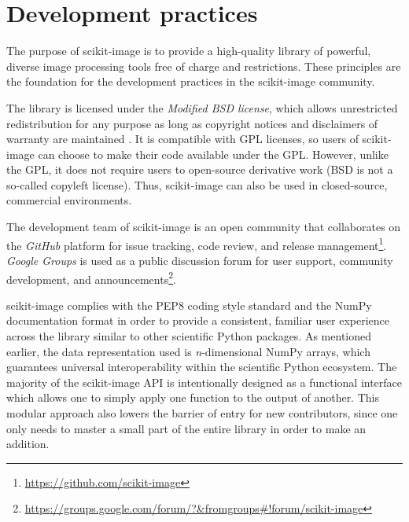 
\section*{Development practices}
  \label{sec:development-practices}

  The purpose of scikit-image is to provide a high-quality library of powerful, diverse image processing tools free of charge and restrictions. These principles are the foundation for the development practices in the scikit-image community.

  The library is licensed under the \emph{Modified BSD license}, which allows unrestricted redistribution for any purpose as long as copyright notices and disclaimers of warranty are maintained \citep{BSD}. It is compatible with GPL licenses, so users of scikit-image can choose to make their code available under the GPL. However, unlike the GPL, it does not require users to open-source derivative work (BSD is not a so-called copyleft license). Thus, scikit-image can also be used in closed-source, commercial environments.

  The development team of scikit-image is an open community that collaborates on the \emph{GitHub} platform for issue tracking, code review, and release management\footnote{\url{https://github.com/scikit-image}}. \emph{Google Groups} is used as a public discussion forum for user support, community development, and announcements\footnote{\url{https://groups.google.com/forum/?&fromgroups\#!forum/scikit-image}}.

  scikit-image complies with the PEP8 coding style standard \citep{PEP8} and the NumPy documentation format \citep{NumpyDoc} in order to provide a consistent, familiar user experience across the library similar to other scientific Python packages. As mentioned earlier, the data representation used is \emph{n}-dimensional NumPy arrays, which guarantees universal interoperability within the scientific Python ecosystem. The majority of the scikit-image API is intentionally designed as a functional interface which allows one to simply apply one function to the output of another. This modular approach also lowers the barrier of entry for new contributors, since one only needs to master a small part of the entire library in order to make an addition.

